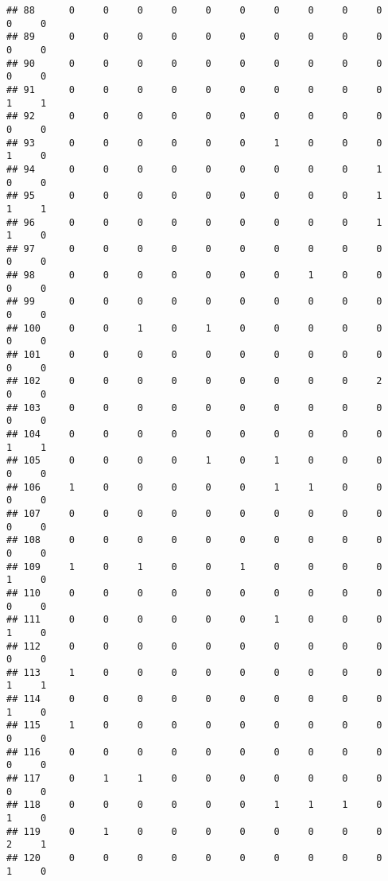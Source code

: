 \documentclass[
]{article}
\begin{document}
\begin{verbatim}
## 88      0     0     0     0     0     0     0     0     0     0     0     0
## 89      0     0     0     0     0     0     0     0     0     0     0     0
## 90      0     0     0     0     0     0     0     0     0     0     0     0
## 91      0     0     0     0     0     0     0     0     0     0     1     1
## 92      0     0     0     0     0     0     0     0     0     0     0     0
## 93      0     0     0     0     0     0     1     0     0     0     1     0
## 94      0     0     0     0     0     0     0     0     0     1     0     0
## 95      0     0     0     0     0     0     0     0     0     1     1     1
## 96      0     0     0     0     0     0     0     0     0     1     1     0
## 97      0     0     0     0     0     0     0     0     0     0     0     0
## 98      0     0     0     0     0     0     0     1     0     0     0     0
## 99      0     0     0     0     0     0     0     0     0     0     0     0
## 100     0     0     1     0     1     0     0     0     0     0     0     0
## 101     0     0     0     0     0     0     0     0     0     0     0     0
## 102     0     0     0     0     0     0     0     0     0     2     0     0
## 103     0     0     0     0     0     0     0     0     0     0     0     0
## 104     0     0     0     0     0     0     0     0     0     0     1     1
## 105     0     0     0     0     1     0     1     0     0     0     0     0
## 106     1     0     0     0     0     0     1     1     0     0     0     0
## 107     0     0     0     0     0     0     0     0     0     0     0     0
## 108     0     0     0     0     0     0     0     0     0     0     0     0
## 109     1     0     1     0     0     1     0     0     0     0     1     0
## 110     0     0     0     0     0     0     0     0     0     0     0     0
## 111     0     0     0     0     0     0     1     0     0     0     1     0
## 112     0     0     0     0     0     0     0     0     0     0     0     0
## 113     1     0     0     0     0     0     0     0     0     0     1     1
## 114     0     0     0     0     0     0     0     0     0     0     1     0
## 115     1     0     0     0     0     0     0     0     0     0     0     0
## 116     0     0     0     0     0     0     0     0     0     0     0     0
## 117     0     1     1     0     0     0     0     0     0     0     0     0
## 118     0     0     0     0     0     0     1     1     1     0     1     0
## 119     0     1     0     0     0     0     0     0     0     0     2     1
## 120     0     0     0     0     0     0     0     0     0     0     1     0

\end{verbatim}
\end{document}
